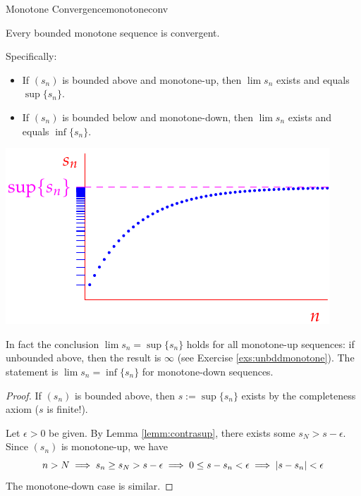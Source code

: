 \begin{thm}[lower separated=false, sidebyside, sidebyside align=top seam, sidebyside gap=0pt, righthand width=0.48\linewidth]{Monotone Convergence}{monotoneconv}\par
	Every bounded monotone sequence is convergent.\par Specifically:
	\begin{itemize}
	  \item If $(s_n)$ is bounded above and monotone-up, then $\lim s_n$ exists and equals $\sup\{s_n\}$.
	  \item If $(s_n)$ is bounded below and monotone-down, then $\lim s_n$ exists and equals $\inf\{s_n\}$.
	\end{itemize}
	\tcblower
	\flushright\includegraphics{monotone}
\end{thm}

In fact the conclusion $\lim s_n=\sup\{s_n\}$ holds for all monotone-up sequences: if unbounded above, then the result is $\infty$ (see Exercise \ref{exs:unbddmonotone}). The statement is $\lim s_n=\inf\{s_n\}$ for monotone-down sequences.


\begin{proof}
	If $(s_n)$ is bounded above, then $s:=\sup\{s_n\}$ exists by the completeness axiom ($s$ is finite!).\par
	Let $\epsilon>0$ be given. By Lemma \ref{lemm:contrasup}, there exists some $s_N>s-\epsilon$. Since $(s_n)$ is monotone-up, we have
	\[n>N\implies s_n\ge s_N>s-\epsilon\implies 0\le s-s_n<\epsilon\implies \left| s-s_n\right|<\epsilon\]
	The monotone-down case is similar.
\end{proof}



